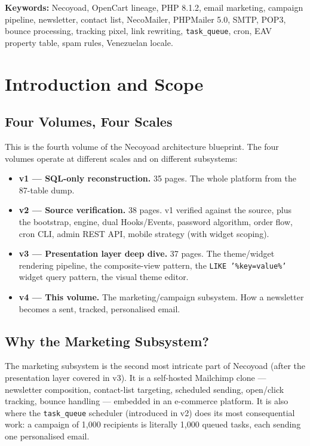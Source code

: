 \documentclass[11pt,a4paper]{article}
\begin{document}
\vspace{0.6em}
\noindent\textbf{Keywords:} Necoyoad, OpenCart lineage, PHP 8.1.2,
email marketing, campaign pipeline, newsletter, contact list,
NecoMailer, PHPMailer 5.0, SMTP, POP3, bounce processing, tracking
pixel, link rewriting, \texttt{task\_queue}, cron, EAV property
table, spam rules, Venezuelan locale.

\newpage
\tableofcontents
\newpage

\section{Introduction and Scope}\label{sec:intro}

\subsection{Four Volumes, Four Scales}

This is the fourth volume of the Necoyoad architecture blueprint.
The four volumes operate at different scales and on different
subsystems:

\begin{itemize}[leftmargin=1.6em,itemsep=2pt]
  \item \textbf{v1 --- SQL-only reconstruction.} 35 pages. The whole
        platform from the 87-table dump.
  \item \textbf{v2 --- Source verification.} 38 pages. v1 verified
        against the source, plus the bootstrap, engine, dual
        Hooks/Events, password algorithm, order flow, cron CLI,
        admin REST API, mobile strategy (with widget scoping).
  \item \textbf{v3 --- Presentation layer deep dive.} 37 pages. The
        theme/widget rendering pipeline, the composite-view pattern,
        the \texttt{LIKE '\%key=value\%'} widget query pattern, the
        visual theme editor.
  \item \textbf{v4 --- This volume.} The marketing/campaign subsystem.
        How a newsletter becomes a sent, tracked, personalised email.
\end{itemize}

\subsection{Why the Marketing Subsystem?}

The marketing subsystem is the second most intricate part of Necoyoad
(after the presentation layer covered in v3). It is a self-hosted
Mailchimp clone --- newsletter composition, contact-list targeting,
scheduled sending, open/click tracking, bounce handling --- embedded
in an e-commerce platform. It is also where the \texttt{task\_queue}
scheduler (introduced in v2) does its most consequential work: a
campaign of 1,000 recipients is literally 1,000 queued tasks, each
sending one personalised email.
\end{document}
